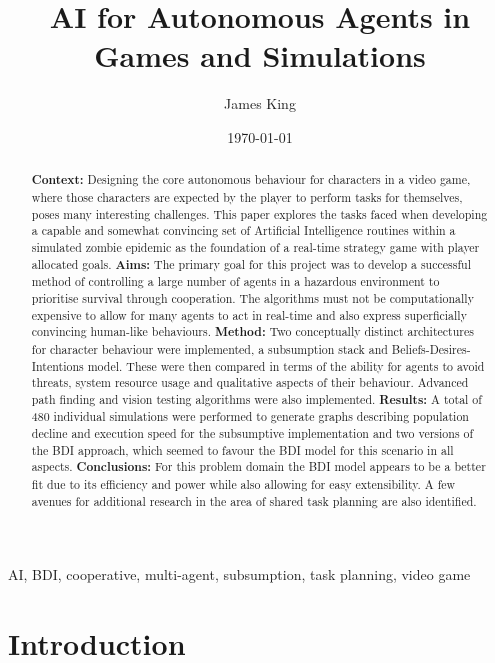 \documentclass[a4paper,12pt]{article}
\title{AI for Autonomous Agents in Games and Simulations}
\author{James King}
\date{\today}
\begin{document}
\maketitle

\begin{abstract} {\bf Context:} Designing the core autonomous behaviour for characters in a video game, where those characters are expected by the player to perform tasks for themselves, poses many interesting challenges. This paper explores the tasks faced when developing a capable and somewhat convincing set of Artificial Intelligence routines within a simulated zombie epidemic as the foundation of a real-time strategy game with player allocated goals.
{\bf Aims:} The primary goal for this project was to develop a successful method of controlling a large number of agents in a hazardous environment to prioritise survival through cooperation. The algorithms must not be computationally expensive to allow for many agents to act in real-time and also express superficially convincing human-like behaviours.
{\bf Method:} Two conceptually distinct architectures for character behaviour were implemented, a subsumption stack and Beliefs-Desires-Intentions model. These were then compared in terms of the ability for agents to avoid threats, system resource usage and qualitative aspects of their behaviour. Advanced path finding and vision testing algorithms were also implemented.
{\bf Results:} A total of 480 individual simulations were performed to generate graphs describing population decline and execution speed for the subsumptive implementation and two versions of the BDI approach, which seemed to favour the BDI model for this scenario in all aspects.
{\bf Conclusions:} For this problem domain the BDI model appears to be a better fit due to its efficiency and power while also allowing for easy extensibility. A few avenues for additional research in the area of shared task planning are also identified.
\end{abstract}

\begin{keywords}
AI, BDI, cooperative, multi-agent, subsumption, task planning, video game
\end{keywords}

\section{Introduction}
\end{document}
